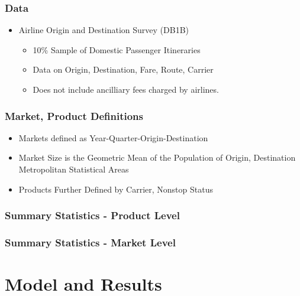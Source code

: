 \documentclass[xcolor=dvipsnames]{beamer}
\begin{document}
    \begin{frame}
		\frametitle{Data}
		\begin{itemize}
			\item Airline Origin and Destination Survey (DB1B)
			\begin{itemize}
				\item 10\% Sample of Domestic Passenger Itineraries 
				\item Data on Origin, Destination, Fare, Route, Carrier
                \item Does not include ancilliary fees charged by airlines. 
			\end{itemize}
		\end{itemize}
	\end{frame}

    \begin{frame}
        \frametitle{Market, Product Definitions}
        \begin{itemize}
        	\item Markets defined as Year-Quarter-Origin-Destination 
			\item Market Size is the Geometric Mean of the Population of Origin, Destination Metropolitan Statistical Areas
			\item Products Further Defined by Carrier, Nonstop Status
        \end{itemize}
    \end{frame}

    \begin{frame}
        \frametitle{Summary Statistics - Product Level}
        
    \end{frame}

    \begin{frame}
        \frametitle{Summary Statistics - Market Level}
        
    \end{frame}

    \section{Model and Results}
    
\end{document}
